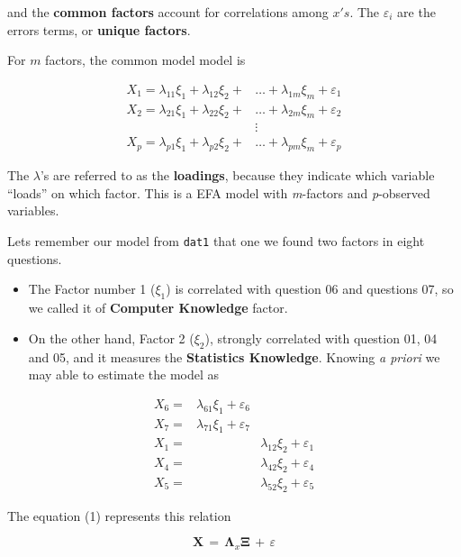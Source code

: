 \documentclass[
]{article}
\begin{document}
and the \textbf{common factors} account for correlations among \(x's\).
The \(\varepsilon_{i}\) are the errors terms, or \textbf{unique
factors}.

For \(m\) factors, the common model model is

\[\begin{align} 
X_{1}=\lambda_{11}\xi_{1}+\lambda_{12}\xi_{2}+&\ldots+\lambda_{1m}\xi_{m}+\varepsilon_{1}\\ 
X_{2}=\lambda_{21}\xi_{1}+\lambda_{22}\xi_{2}+&\ldots+\lambda_{2m}\xi_{m}+\varepsilon_{2}\\
&\vdots\\
X_{p}=\lambda_{p1}\xi_{1}+\lambda_{p2}\xi_{2}+&\ldots+\lambda_{pm}\xi_{m}+\varepsilon_{p}
\end{align}\]

The \(\lambda\)'s are referred to as the \textbf{loadings}, because they
indicate which variable ``loads'' on which factor. This is a EFA model
with \emph{m}-factors and \emph{p}-observed variables.

Lets remember our model from \texttt{dat1} that one we found two factors
in eight questions.

\begin{itemize}
\item
  The Factor number 1 (\(\xi_{1}\)) is correlated with question 06 and
  questions 07, so we called it of \textbf{Computer Knowledge} factor.
\item
  On the other hand, Factor 2 (\(\xi_{2}\)), strongly correlated with
  question 01, 04 and 05, and it measures the \textbf{Statistics
  Knowledge}. Knowing \emph{a priori} we may able to estimate the model
  as
\end{itemize}

\[
\begin{align}
X_{6}=&\lambda_{61}\xi_{1}+\varepsilon_{6}\\ 
X_{7}=&\lambda_{71}\xi_{1}+\varepsilon_{7}\\
X_{1}=& &\lambda_{12}\xi_{2}+\varepsilon_{1}\\ 
X_{4}=& &\lambda_{42}\xi_{2}+\varepsilon_{4}\\
X_{5}=& &\lambda_{52}\xi_{2}+\varepsilon_{5}
\end{align}
\]

The equation (1) represents this relation

\[
\mathbf{X}\,=\,\mathbf{\Lambda}_{x}\mathbf{\Xi}\,+\,\varepsilon \tag{1}
\]
\end{document}
